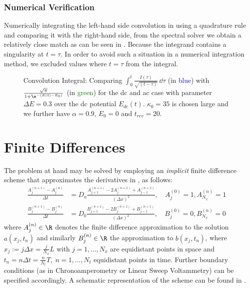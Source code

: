 \documentclass{prettytex/ox/mmsc-special-topic}
\begin{document}
  \subsubsection{Numerical Verification}
  Numerically integrating the left-hand side convolution in  using a quadrature rule and comparing it with the right-hand side, from the spectral solver we obtain a relatively close match as can be seen in .
  Because the integrand contains a singularity at $t = \tau$.
  In order to avoid such a situation in a numerical integration method, we excluded values where $t = \tau$ from the integral.
  \begin{figure}[H]
    \centering
    \caption{Convolution Integral: Comparing $\int_{0}^{t} \frac{I(\tau)}{\sqrt{(t - \tau)}} \,\dd\tau$ (in \textcolor{blue}{blue}) with $\frac{\sqrt{\pi}}{1 + \e^{-(E(t) - E_0)}}$ (in \textcolor{green}{green}) for the \gls{dc} and \gls{ac} case with parameter $\Delta E = 0.3$ over the \gls{dc} potential $E_{dc}(t)$. $\kappa_0 = 35$ is chosen large and we further have $\alpha = 0.9$, $E_0 = 0$ and $t_{rev} = 20$.}
    \label{fig:voltammetry-convolution}
  \end{figure}

  \section{Finite Differences}
  \label{sec:finite-differences}
  The problem at hand may be solved by employing an \emph{implicit} finite difference scheme that approximates the derivatives in , as follows:
  \begin{align}
    \label{eq:fd-scheme-a} \frac{A_{j}^{(n+1)} - A_{j}^{(n)}}{\Delta t} & = D_a \frac{A_{j+1}^{(n+1)} - 2 A_{j}^{(n+1)} + A_{j-1}^{(n+1)}}{(\Delta x)^2}, \quad A_j^{(0)} = 1, A_{N_x}^{(n)} = 1 \\
    \label{eq:fd-scheme-b} \frac{B_{j}^{(n+1)} - B_{j}^{(n)}}{\Delta t} & = D_b \frac{B_{j+1}^{(n+1)} - 2 B_{j}^{(n+1)} + B_{j-1}^{(n+1)}}{(\Delta x)^2}, \quad B_j^{(0)} = 0, B_{N_x}^{(n)} = 0
  \end{align}
  where $A_j^{(n)} \in \R$ denotes the finite difference approximation to the solution $a(x_j, t_n)$ and similarly $B_j^{(n)} \in \R$ the approximation to $b(x_j, t_n)$, where $x_j := j \Delta x = \frac{j}{N_x} L$ with $j = 1, ..., N_x$ are equidistant points in space and $t_n = n \Delta t = \frac{n}{N_t} T,\; n = 1, ..., N_t$ equidistant points in time.
  Further boundary conditions (as in Chronoamperometry or Linear Sweep Voltammetry) can be specified accordingly.
  A schematic representation of the scheme can be found in .
\end{document}
